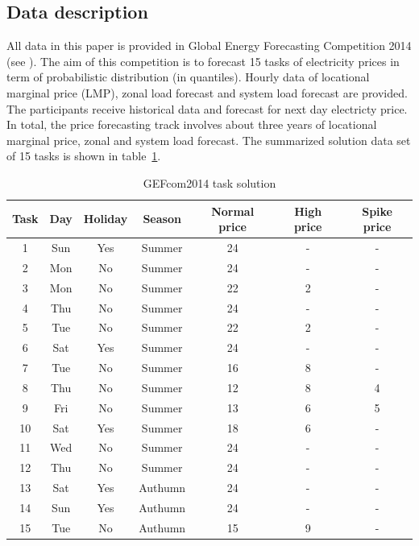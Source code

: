 \documentclass[review]{elsarticle}
\begin{document}
  \subsection{Data description}
    All data in this paper is provided in Global Energy Forecasting Competition 2014 (see \cite{Hong2016}). The aim of this competition is to forecast 15 tasks of electricity prices in term of probabilistic distribution (in quantiles). Hourly data of locational marginal price (LMP), zonal load forecast and system load forecast are provided. The participants receive historical data and forecast for next day electricty price. In total, the price forecasting track involves about three years of locational marginal price, zonal and system load forecast. The summarized solution data set of 15 tasks is shown in table~\ref{table:price_data_set}.

    \begin{table}[H]
      \begin{center}
      \caption{GEFcom2014 task solution}
      \begin{adjustbox}{width=\textwidth}
        \begin{tabular}{|c|c|c|c|c|c|c|}
          \hline
          Task & Day & Holiday & Season & Normal price & High price & Spike price\\
          \hline
          1 & Sun & Yes & Summer & 24 & - & -\\
          2 & Mon & No & Summer & 24 & - & -\\
          3 & Mon & No & Summer & 22 & 2 & -\\
          4 & Thu & No & Summer & 24 & - & -\\
          5 & Tue & No & Summer & 22 & 2 & -\\
          6 & Sat & Yes & Summer & 24 & - & -\\
          7 & Tue & No & Summer & 16 & 8 & -\\
          8 & Thu & No & Summer & 12 & 8 & 4\\
          9 & Fri & No & Summer & 13 & 6 & 5\\
          10 & Sat & Yes & Summer & 18 & 6 & -\\
          11 & Wed & No & Summer & 24 & - & -\\
          12 & Thu & No & Summer & 24 & - & -\\
          13 & Sat & Yes & Authumn & 24 & - & -\\
          14 & Sun & Yes & Authumn & 24 & - & -\\
          15 & Tue & No & Authumn & 15 & 9 & -\\
          \hline
        \end{tabular}
      \end{adjustbox}
      \label{table:price_data_set}
      \end{center}
    \end{table}
\end{document}
